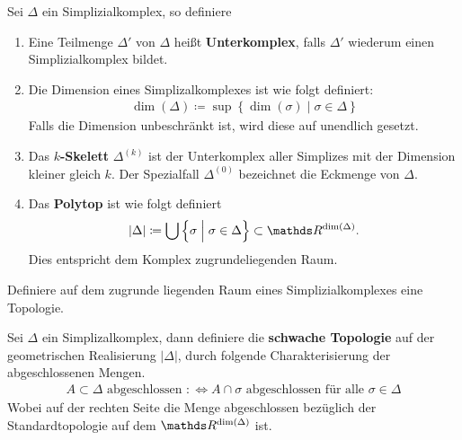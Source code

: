 \begin{Def}
  Sei $\Delta$ ein Simplizialkomplex, so definiere
  \begin{enumerate}[1)]
  \item Eine Teilmenge $\Delta'$ von $\Delta$ heißt
    \textbf{Unterkomplex}, falls $\Delta'$ wiederum einen
    Simplizialkomplex bildet.
  \item Die Dimension eines Simplizalkomplexes ist wie folgt
    definiert:
    \begin{gather*}
      \dim(\Delta) \coloneqq \sup \left\{ \dim(\sigma) \; \Big| \;
        \sigma \in \Delta \right\}
    \end{gather*}
    Falls die Dimension unbeschränkt ist, wird diese auf unendlich
    gesetzt.
  \item Das \textbf{$k$-Skelett} $\Delta^{(k)}$ ist der Unterkomplex
    aller Simplizes mit der Dimension kleiner gleich $k$. Der
    Spezialfall $\Delta^{(0)}$ bezeichnet die Eckmenge von $\Delta$.
  \item Das \textbf{Polytop} ist wie folgt definiert
    \begin{gather*}
      |\Delta| \coloneqq \bigcup \left\{ \sigma \; \Big| \; \sigma \in
        \Delta \right\} \subset \R^{\dim(\Delta)}.
    \end{gather*}
    Dies entspricht dem Komplex zugrundeliegenden Raum.
	\end{enumerate}
\end{Def}

Definiere auf dem zugrunde liegenden Raum eines Simplizialkomplexes eine 
Topologie.

\begin{Def}
	Sei $\Delta$ ein Simplizalkomplex, dann definiere die
	\textbf{schwache Topologie} auf der geometrischen Realisierung $| \Delta |$,
	durch folgende Charakterisierung der abgeschlossenen Mengen.
	\begin{gather*}
		A \subset \Delta \text{ abgeschlossen } :\Leftrightarrow A \cap
		\sigma \text{ abgeschlossen für alle } \sigma \in \Delta
	\end{gather*}
	Wobei auf der rechten Seite die Menge abgeschlossen bezüglich der
	Standardtopologie auf dem $\R^{\dim(\Delta)}$ ist.
\end{Def}

